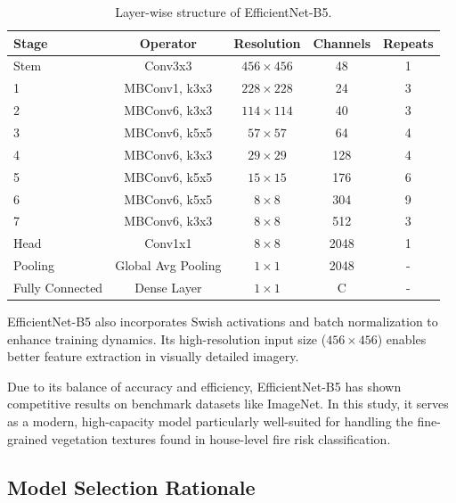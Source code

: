 \begin{table}[ht]
    \centering
    \renewcommand{\arraystretch}{1.3}
    \setlength{\tabcolsep}{10pt}
    \begin{tabular}{lcccc}
        \toprule
        \textbf{Stage} & \textbf{Operator} & \textbf{Resolution} & \textbf{Channels} & \textbf{Repeats} \\ 
        \midrule
        Stem        & Conv3x3           & $456 \times 456$  & 48    & 1 \\
        1          & MBConv1, k3x3     & $228 \times 228$  & 24    & 3 \\
        2          & MBConv6, k3x3     & $114 \times 114$  & 40    & 3 \\
        3          & MBConv6, k5x5     & $57 \times 57$    & 64    & 4 \\
        4          & MBConv6, k3x3     & $29 \times 29$    & 128   & 4 \\
        5          & MBConv6, k5x5     & $15 \times 15$    & 176   & 6 \\
        6          & MBConv6, k5x5     & $8 \times 8$      & 304   & 9 \\
        7          & MBConv6, k3x3     & $8 \times 8$      & 512   & 3 \\
        Head       & Conv1x1           & $8 \times 8$      & 2048  & 1 \\
        Pooling    & Global Avg Pooling & $1 \times 1$     & 2048  & - \\
        Fully Connected & Dense Layer   & $1 \times 1$     & C     & - \\
        \bottomrule
    \end{tabular}
    \caption{Layer-wise structure of EfficientNet-B5.}
    \label{tab:efficientnet_layers}
\end{table}

EfficientNet-B5 also incorporates Swish activations and batch normalization to enhance 
training dynamics. Its high-resolution input size ($456 \times 456$) enables better 
feature extraction in visually detailed imagery.

Due to its balance of accuracy and efficiency, EfficientNet-B5 has shown competitive 
results on benchmark datasets like ImageNet. In this study, it serves as a modern, 
high-capacity model particularly well-suited for handling the fine-grained vegetation 
textures found in house-level fire risk classification.

\subsection{Model Selection Rationale}

